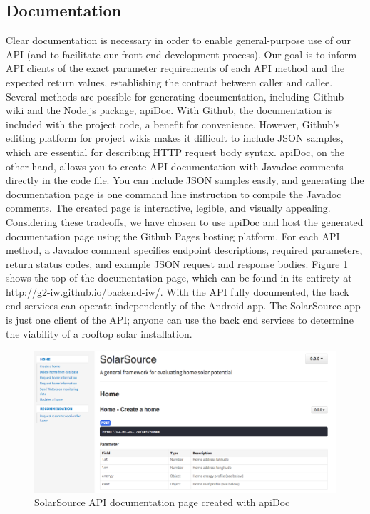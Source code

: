 \documentclass[pageno]{jpaper}
\begin{document}
\subsection{Documentation}
Clear documentation is necessary in order to enable general-purpose use of our API (and to facilitate our front end development process). Our goal is to inform API clients of the exact parameter requirements of each API method and the expected return values, establishing the contract between caller and callee. Several methods are possible for generating documentation, including Github wiki and the Node.js package, apiDoc. With Github, the documentation is included with the project code, a benefit for convenience. However, Github's editing platform for project wikis makes it difficult to include JSON samples, which are essential for describing HTTP request body syntax. apiDoc, on the other hand, allows you to create API documentation with Javadoc comments directly in the code file. You can include JSON samples easily, and generating the documentation page is one command line instruction to compile the Javadoc comments. The created page is interactive, legible, and visually appealing. Considering these tradeoffs, we have chosen to use apiDoc and host the generated documentation page using the Github Pages hosting platform. For each API method, a Javadoc comment specifies endpoint descriptions, required parameters, return status codes, and example JSON request and response bodies. Figure \ref{fig:apidoc} shows the top of the documentation page, which can be found in its entirety at \url{http://g2-iw.github.io/backend-iw/}. With the API fully documented, the back end services can operate independently of the Android app. The SolarSource app is just one client of the API; anyone can use the back end services to determine the viability of a rooftop solar installation.

\begin{figure}[h]
\begin{center}
\includegraphics[width = \textwidth]{apidoc}
\caption{SolarSource API documentation page created with apiDoc}
\label{fig:apidoc}
\end{center}
\end{figure}
\end{document}

